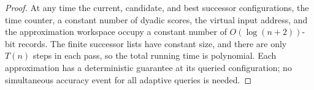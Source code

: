 \begin{proof}
At any time the current, candidate, and best successor configurations,
the time counter, a constant number of dyadic scores, the virtual
input address, and the approximation workspace occupy a constant
number of $O(\log(n+2))$-bit records. The finite successor lists
have constant size, and there are only $T(n)$ steps in each pass,
so the total running time is polynomial. Each approximation has a
deterministic guarantee at its queried configuration; no simultaneous
accuracy event for all adaptive queries is needed.
\end{proof}

